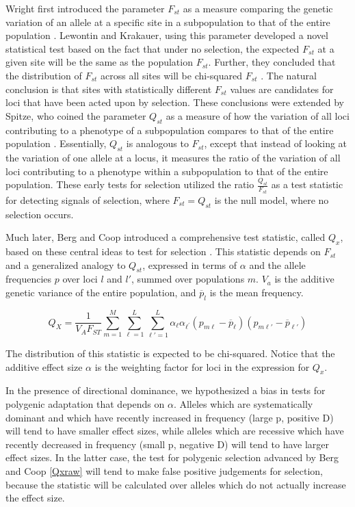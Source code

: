 \documentclass[a4paper,12pt]{article}
\begin{document}
Wright first introduced the parameter $F_{st}$ as a measure comparing
the genetic variation of an allele at a specific site in a subpopulation to that of the entire population
\cite{Fst}. Lewontin and Krakauer, using this parameter developed a
novel statistical test based on the fact
that under no selection, the expected $F_{st}$ at a given site will be the same
as the population $F_{st}$. Further, they concluded that the
distribution of $F_{st}$ across all sites will be chi-squared
$F_{st}$ \cite{firstseltest}. The natural conclusion is that sites
with statistically different $F_{st}$ values are candidates for loci
that have been acted upon by selection. These conclusions were extended by Spitze, who coined the
parameter $Q_{st}$ as a measure of how the variation of all loci
contributing to a phenotype of a subpopulation compares to that of the entire
population \cite{Qst}. Essentially, $Q_{st}$ is analogous to $F_{st}$,
except that instead of looking at the variation of one allele at a
locus, it measures the ratio of the variation of all loci contributing to a
phenotype within a subpopulation to that of the entire population. These early tests for selection utilized the ratio
$\frac{Q_{st}}{F_{st}}$ as a test statistic for detecting signals of
selection, where $F_{st} = Q_{st}$ is the null model, where no
selection occurs.

Much later, Berg and Coop introduced a comprehensive test statistic,
called $Q_x$, based on these central ideas to test
for selection \cite{berg}. This statistic depends on $F_{st}$ and
a generalized analogy to $Q_{st}$, expressed in terms of $\alpha$ and
the allele frequencies $p$ over loci $l$ and $l'$, summed over
populations $m$. $V_a$ is the additive genetic variance of the entire
population, and $\overline{p}_l$ is the mean frequency.

\begin{equation} \label{Qxraw}
  Q_X = \frac{1}{V_A F_{ST}} \sum_{m=1}^M \sum_{\ell=1}^L \sum_{\ell\prime=1}^L \alpha_{\ell} \alpha_{\ell^{\prime}}\left(p_{m\ell} - \overline{p}_\ell \right)\left(p_{m \ell\prime} - \overline{p}_{\ell\prime}\right)
\end{equation}


The distribution of this statistic is expected to be chi-squared. Notice that the additive effect size $\alpha$ is the weighting factor for loci in the
expression for $Q_x$. 

In the presence of directional dominance, we hypothesized a bias in
tests for polygenic adaptation that depends on $\alpha$. Alleles which are systematically dominant and which have recently increased in
frequency (large p, positive D) will tend to have smaller effect sizes, while
alleles which are recessive which have recently decreased in frequency
(small p, negative D) will tend to have larger effect sizes. In the
latter case, the test for polygenic selection advanced by Berg and Coop
\eqref{Qxraw} will tend to make false positive judgements for
selection, because the statistic will be calculated over alleles which
do not actually increase the effect size.
\end{document}
